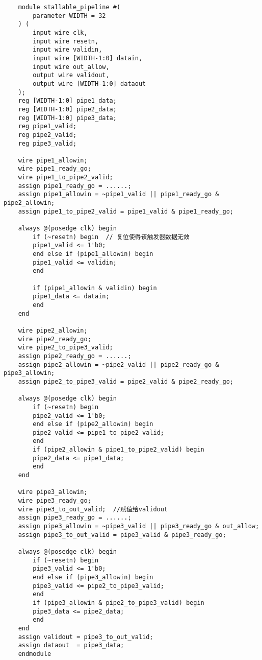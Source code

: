 \begin{lstlisting}
    module stallable_pipeline #(
        parameter WIDTH = 32
    ) (
        input wire clk,
        input wire resetn,
        input wire validin,
        input wire [WIDTH-1:0] datain,
        input wire out_allow,
        output wire validout,
        output wire [WIDTH-1:0] dataout
    );
    reg [WIDTH-1:0] pipe1_data;
    reg [WIDTH-1:0] pipe2_data;
    reg [WIDTH-1:0] pipe3_data;
    reg pipe1_valid;
    reg pipe2_valid;
    reg pipe3_valid;

    wire pipe1_allowin;
    wire pipe1_ready_go;
    wire pipe1_to_pipe2_valid;
    assign pipe1_ready_go = ......;
    assign pipe1_allowin = ~pipe1_valid || pipe1_ready_go & pipe2_allowin;
    assign pipe1_to_pipe2_valid = pipe1_valid & pipe1_ready_go;

    always @(posedge clk) begin
        if (~resetn) begin  // 复位使得该触发器数据无效
        pipe1_valid <= 1'b0;
        end else if (pipe1_allowin) begin
        pipe1_valid <= validin;
        end

        if (pipe1_allowin & validin) begin
        pipe1_data <= datain;
        end
    end

    wire pipe2_allowin;
    wire pipe2_ready_go;
    wire pipe2_to_pipe3_valid;
    assign pipe2_ready_go = ......;
    assign pipe2_allowin = ~pipe2_valid || pipe2_ready_go & pipe3_allowin;
    assign pipe2_to_pipe3_valid = pipe2_valid & pipe2_ready_go;

    always @(posedge clk) begin
        if (~resetn) begin
        pipe2_valid <= 1'b0;
        end else if (pipe2_allowin) begin
        pipe2_valid <= pipe1_to_pipe2_valid;
        end
        if (pipe2_allowin & pipe1_to_pipe2_valid) begin
        pipe2_data <= pipe1_data;
        end
    end

    wire pipe3_allowin;
    wire pipe3_ready_go;
    wire pipe3_to_out_valid;  //赋值给validout
    assign pipe3_ready_go = ......;
    assign pipe3_allowin = ~pipe3_valid || pipe3_ready_go & out_allow;
    assign pipe3_to_out_valid = pipe3_valid & pipe3_ready_go;

    always @(posedge clk) begin
        if (~resetn) begin
        pipe3_valid <= 1'b0;
        end else if (pipe3_allowin) begin
        pipe3_valid <= pipe2_to_pipe3_valid;
        end
        if (pipe3_allowin & pipe2_to_pipe3_valid) begin
        pipe3_data <= pipe2_data;
        end
    end
    assign validout = pipe3_to_out_valid;
    assign dataout  = pipe3_data;
    endmodule
\end{lstlisting}


